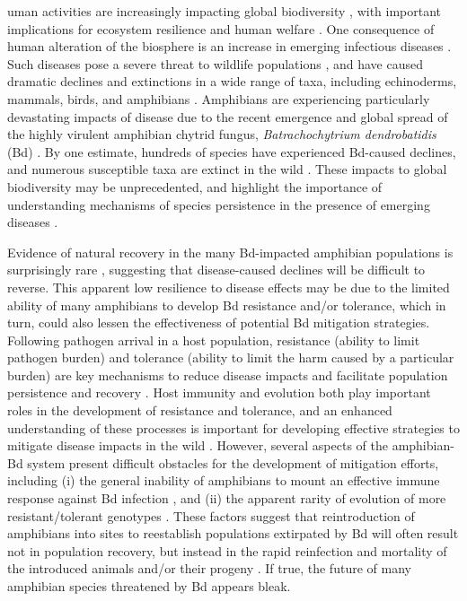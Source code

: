 \documentclass[9pt,twocolumn,twoside,lineno]{pnas-new}
\begin{document}

uman activities are increasingly impacting global biodiversity
\citep{ceballos2015}, with important implications for ecosystem
resilience and human welfare \citep{naeem2009}. One consequence of human
alteration of the biosphere is an increase in emerging infectious
diseases \citep{jones2008, fisher2012}. Such diseases pose a severe
threat to wildlife populations \citep{daszak2000}, and have caused
dramatic declines and extinctions in a wide range of taxa, including
echinoderms, mammals, birds, and amphibians
\citep{hewson2014, samuel2015, scheele2019, cunningham2021}. Amphibians
are experiencing particularly devastating impacts of disease due to the
recent emergence and global spread of the highly virulent amphibian
chytrid fungus, \emph{Batrachochytrium dendrobatidis} (Bd)
\citep{luedtke2023, scheele2019}. By one estimate, hundreds of species
have experienced Bd-caused declines, and numerous susceptible taxa are
extinct in the wild \citep{scheele2019}. These impacts to global
biodiversity may be unprecedented, and highlight the importance of
understanding mechanisms of species persistence in the presence of
emerging diseases \citep{russell2020}.

Evidence of natural recovery in the many Bd-impacted amphibian
populations is surprisingly rare \citep[for notable exceptions,
see][]{scheele2017, voyles2018, knapp2016}, suggesting that
disease-caused declines will be difficult to reverse. This apparent low
resilience to disease effects may be due to the limited ability of many
amphibians to develop Bd resistance and/or tolerance, which in turn,
could also lessen the effectiveness of potential Bd mitigation
strategies. Following pathogen arrival in a host population, resistance
(ability to limit pathogen burden) and tolerance (ability to limit the
harm caused by a particular burden) are key mechanisms to reduce disease
impacts \citep{raberg2009} and facilitate population persistence and
recovery \citep{brannelly2021}. Host immunity and evolution both play
important roles in the development of resistance and tolerance, and an
enhanced understanding of these processes is important for developing
effective strategies to mitigate disease impacts in the wild
\citep{garner2016, woodhams2011}. However, several aspects of the
amphibian-Bd system present difficult obstacles for the development of
mitigation efforts, including (i) the general inability of amphibians to
mount an effective immune response against Bd infection
\citep{rosenblum2012, fites2013, grogan2018a}, and (ii) the apparent
rarity of evolution of more resistant/tolerant genotypes \citep[but
see][]{savage2016, grogan2018b}. These factors suggest that
reintroduction of amphibians into sites to reestablish populations
extirpated by Bd will often result not in population recovery, but
instead in the rapid reinfection and mortality of the introduced animals
and/or their progeny
\citep{hammond2021, knapp2022, stockwell2008, scheele2021}. If true, the
future of many amphibian species threatened by Bd appears bleak.
\end{document}
